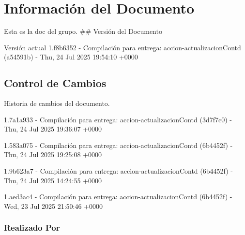 \documentclass[
	a4paper, %
	12pt, %
]{include/CSSullivanBusinessReport}
\begin{document}
\newpage

\begin{twothirdswidth} %
	\tableofcontents %
\end{twothirdswidth}

\newpage


\newpage

\section{Información del
Documento}\label{sec:informaciuxf3n-del-documento}

Esta es la doc del grupo. \#\# Versión del Documento

\begin{quote}
\end{quote}

Versión actual 1.f8b6352 - Compilación para entrega:
accion-actualizacionContd (a54591b) - Thu, 24 Jul 2025 19:54:10 +0000

\subsection{Control de Cambios}\label{sec:control-de-cambios}

Historia de cambios del documento.

1.7a1a933 - Compilación para entrega: accion-actualizacionContd
(3d7f7c0) - Thu, 24 Jul 2025 19:36:07 +0000

1.583a075 - Compilación para entrega: accion-actualizacionContd
(6b4452f) - Thu, 24 Jul 2025 19:25:08 +0000

1.9b623a7 - Compilación para entrega: accion-actualizacionContd
(6b4452f) - Thu, 24 Jul 2025 14:24:55 +0000

1.aed3ac4 - Compilación para entrega: accion-actualizacionContd
(6b4452f) - Wed, 23 Jul 2025 21:50:46 +0000

\subsubsection{Realizado Por}\label{sec:realizado-por}
\end{document}
